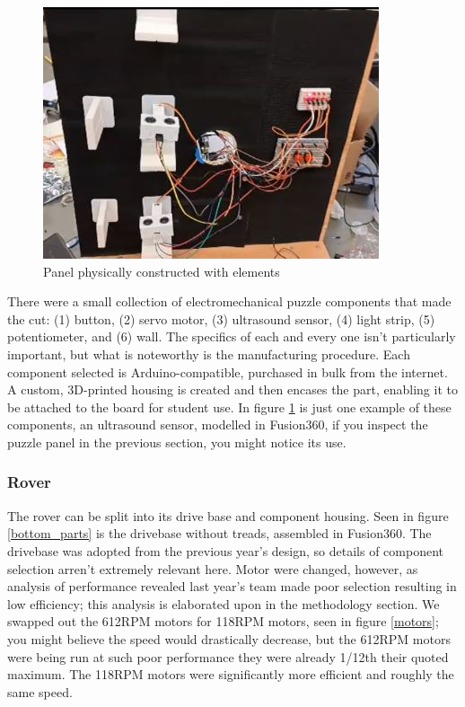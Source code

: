 \documentclass[a4paper, 10pt]{article}
\begin{document}
		\begin{figure} [h]
			\centering
			\includegraphics[scale=1]{Photos/puzzle_panel_real}
			\caption{Panel physically constructed with elements}
			\label{puzzle_panel_real}
		\end{figure}
		
		There were a small collection of electromechanical puzzle components that made the cut: (1) button, (2) servo motor, (3) ultrasound sensor, (4) light strip, (5) potentiometer, and (6) wall. The specifics of each and every one isn't particularly important, but what is noteworthy is the manufacturing procedure. Each component selected is Arduino-compatible, purchased in bulk from the internet. A custom, 3D-printed housing is created and then encases the part, enabling it to be attached to the board for student  use. In figure \ref{puzzle_panel_real} is just one example of these components, an ultrasound sensor, modelled in Fusion360, if you inspect the puzzle panel in the previous section, you might notice its use.
		
 		\subsubsection*{Rover}
		The rover can be split into its drive base and component housing. Seen in figure \ref{bottom_parts} is the drivebase without treads, assembled in Fusion360. The drivebase was adopted from the previous year's design, so details of component selection arren't extremely relevant here. Motor were changed, however, as analysis of performance revealed last year's team made poor selection resulting in low efficiency; this analysis is elaborated upon in the methodology section. We swapped out the 612RPM motors for 118RPM motors, seen in figure \ref{motors}; you might believe the speed would drastically decrease, but the 612RPM motors were being run at such poor performance they were already 1/12th their quoted maximum. The 118RPM motors were significantly more efficient and roughly the same speed.
		
\end{document}
